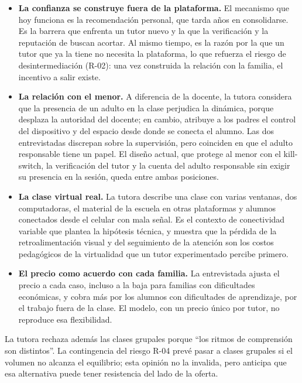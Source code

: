 \begin{itemize}
    \item \textbf{La confianza se construye fuera de la plataforma.} El
          mecanismo que hoy funciona es la recomendación personal, que
          tarda años en consolidarse. Es la barrera que enfrenta un tutor
          nuevo y la que la verificación y la reputación de \sistema{}
          buscan acortar. Al mismo tiempo, es la razón por la que un
          tutor que ya la tiene no necesita la plataforma, lo que
          refuerza el riesgo de desintermediación (R-02): una vez
          construida la relación con la familia, el incentivo a salir
          existe.
    \item \textbf{La relación con el menor.} A diferencia de la docente,
          la tutora considera que la presencia de un adulto en la clase
          perjudica la dinámica, porque desplaza la autoridad del docente;
          en cambio, atribuye a los padres el control del dispositivo y del
          espacio desde donde se conecta el alumno. Las dos entrevistadas
          discrepan sobre la supervisión, pero coinciden en que el adulto
          responsable tiene un papel. El diseño actual, que protege al menor
          con el kill-switch, la verificación del tutor y la cuenta del
          adulto responsable sin exigir su presencia en la sesión, queda
          entre ambas posiciones.
    \item \textbf{La clase virtual real.} La tutora describe una clase con
          varias ventanas, dos computadoras, el material de la escuela en
          otras plataformas y alumnos conectados desde el celular con mala
          señal. Es el contexto de conectividad variable que plantea la
          hipótesis técnica, y muestra que la pérdida de la
          retroalimentación visual y del seguimiento de la atención son los
          costos pedagógicos de la virtualidad que un tutor experimentado
          percibe primero.
    \item \textbf{El precio como acuerdo con cada familia.} La
          entrevistada ajusta el precio a cada caso, incluso a la baja
          para familias con dificultades económicas, y cobra más por los
          alumnos con dificultades de aprendizaje, por el trabajo fuera de
          la clase. El modelo, con un precio único por tutor, no reproduce
          esa flexibilidad.
\end{itemize}

La tutora rechaza además las clases grupales porque ``los ritmos de
comprensión son distintos''. La contingencia del riesgo R-04 prevé pasar
a clases grupales si el volumen no alcanza el equilibrio; esta opinión no
la invalida, pero anticipa que esa alternativa puede tener resistencia
del lado de la oferta.

